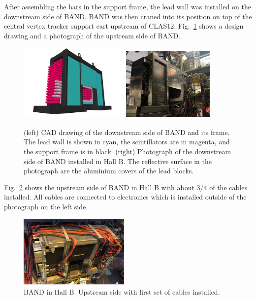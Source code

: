\documentclass[3p,final,twocolumn]{elsarticle}
\begin{document}
After assembling the bars in the support frame, the lead wall was
installed on the downstream side of BAND. BAND was then
craned into its position on top of the central vertex tracker support
cart upstream of CLAS12. Fig.~\ref{fig:band_downstream} shows a
design drawing and a photograph of the upstream side of BAND. 
\begin{figure}[tb]
	\centering
	\includegraphics[width=0.48\textwidth]{BAND_1-3.png} 
	\includegraphics[width=0.40\textwidth]{pic-bandinhall1.pdf}
		\caption{(left) CAD drawing of the downstream side of BAND and its frame. The lead wall is shown in cyan, the scintillators
          are in magenta, and the support frame is in black. (right) Photograph of the downstream side of BAND installed in Hall B. The reflective surface in the photograph are the aluminium covers of the lead blocks.}
		\label{fig:band_downstream}
\end{figure}

Fig.~\ref{fig:bandinhall} shows the upstream side of BAND in Hall B with about 3/4 of the cables installed. All cables are connected to
electronics which is installed outside of the photograph on the left side.
\begin{figure}[tb]
	\centering
	\includegraphics[width=0.48\textwidth]{pic-bandinhall2.pdf}
				\caption{BAND in Hall B. Upstream side with first set of cables installed.}
		\label{fig:bandinhall}
\end{figure}
\end{document}
